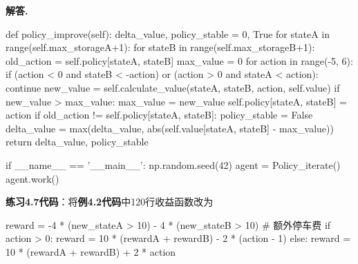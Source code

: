 \documentclass[12pt, a4paper, oneside]{ctexart}
\newenvironment{solution}[1][]{\par\noindent\textbf{#1解答. }}{\smallskip\par}  %
\begin{document}
\begin{solution}
\begin{pythoncode}
    def policy_improve(self):
        delta_value, policy_stable = 0, True
        for stateA in range(self.max_storageA+1):
            for stateB in range(self.max_storageB+1):
                old_action = self.policy[stateA, stateB]
                max_value = 0
                for action in range(-5, 6):
                    if (action < 0 and stateB < -action) or (action > 0 and stateA < action):
                        continue
                    new_value = self.calculate_value(stateA, stateB, action, self.value)
                    if new_value > max_value:
                        max_value = new_value
                        self.policy[stateA, stateB] = action
                if old_action != self.policy[stateA, stateB]:
                    policy_stable = False
                delta_value = max(delta_value, abs(self.value[stateA, stateB] - max_value))
        return delta_value, policy_stable

if __name__ == '__main__':
    np.random.seed(42)
    agent = Policy_iterate()
    agent.work()
    \end{pythoncode}
    \textbf{练习4.7代码}：将\textbf{例4.2代码}中120行收益函数改为
    \begin{pythoncode}
    reward = -4 * (new_stateA > 10) - 4 * (new_stateB > 10)  # 额外停车费
    if action > 0:
        reward = 10 * (rewardA + rewardB) - 2 * (action - 1)
    else:
        reward = 10 * (rewardA + rewardB) + 2 * action
    \end{pythoncode}
\end{solution}
\end{document}
